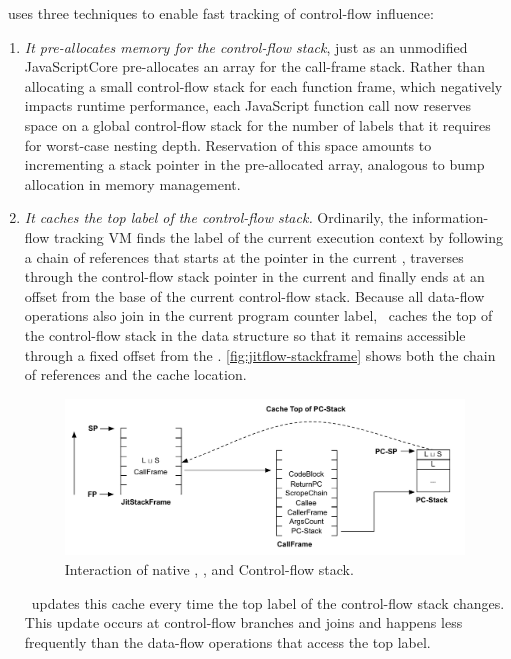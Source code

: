 \JitFlow\ uses three techniques to enable fast tracking of control-flow influence:
\begin{enumerate}

\item \textit{It pre-allocates memory for the control-flow stack}, just as an unmodified JavaScriptCore pre-allocates an array for the call-frame stack.
Rather than allocating a small control-flow stack for each function frame, which negatively impacts runtime performance, each JavaScript function call now reserves space on a global control-flow stack for the number of labels that it requires for worst-case nesting depth.
Reservation of this space amounts to incrementing a stack pointer in the pre-allocated array, analogous to bump allocation in memory management.

\item \textit{It caches the top label of the control-flow stack.}
Ordinarily, the information-flow tracking VM finds the label of the current execution context by following a chain of references that starts at the  pointer in the current , traverses through the control-flow stack pointer in the current  and finally ends at an offset from the base of the current control-flow stack.
Because all data-flow operations also join in the current program counter label, \JitFlow\ caches the top of the control-flow stack in the  data structure so that it remains accessible through a fixed offset from the .
\autoref{fig:jitflow-stackframe} shows both the chain of references and the cache location.

\begin{figure}[ht]
  \centerline{\includegraphics[width=\linewidth,keepaspectratio=true]{graphics/stackframe.pdf}}
  \caption{Interaction of native , , and Control-flow stack.}
  \label{fig:jitflow-stackframe}
\end{figure}

\JitFlow\ updates this cache every time the top label of the control-flow stack changes.
This update occurs at control-flow branches and joins and happens less frequently than the data-flow operations that access the top label.


\end{enumerate}
